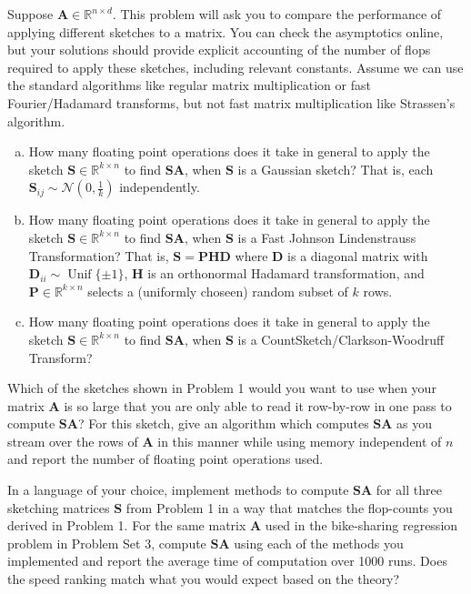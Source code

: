 \documentclass[12pt,letterpaper,cm]{hmcpset}
\newcommand\R{\mathbb{R}}
\newcommand\A{\boldsymbol{A}}
\renewcommand\P{\boldsymbol{P}}
\renewcommand\S{\boldsymbol{S}}
\renewcommand\H{\boldsymbol{H}}
\newcommand\D{\boldsymbol{D}}
\begin{document}
\begin{problem}[1]
    Suppose $\A\in\R^{n\times d}$. This problem will ask you to compare the performance of applying different sketches to a matrix. You can check the asymptotics online, but your solutions should provide explicit accounting of the number of flops required to apply these sketches, including relevant constants. Assume we can use the standard algorithms like regular matrix multiplication or fast Fourier/Hadamard transforms, but not fast matrix multiplication like Strassen's algorithm.
    \begin{enumerate}[(a)]
        \item How many floating point operations does it take in general to apply the sketch $\S\in\R^{k\times n}$ to find $\S\A$, when $\S$ is a Gaussian sketch? That is, each $\S_{ij} \sim \mathcal{N}(0,\tfrac{1}{k})$ independently.
        \item How many floating point operations does it take in general to apply the sketch $\S\in\R^{k\times n}$ to find $\S\A$, when $\S$ is a Fast Johnson Lindenstrauss Transformation? That is, $\S = \P\H\D$ where $\D$ is a diagonal matrix with $\D_{ii}\sim \operatorname{Unif}\{\pm 1\}$, $\H$ is an orthonormal Hadamard transformation, and $\P\in\R^{k\times n}$ selects a (uniformly choseen) random subset of $k$ rows.
        \item How many floating point operations does it take in general to apply the sketch $\S\in\R^{k\times n}$ to find $\S\A$, when $\S$ is a CountSketch/Clarkson-Woodruff Transform?
    \end{enumerate}
\end{problem}

\begin{solution}
    \vfill
\end{solution}

\begin{problem}[2]
    Which of the sketches shown in Problem 1 would you want to use when your matrix $\A$ is so large that you are only able to read it row-by-row in one pass to compute $\S\A$? For this sketch, give an algorithm which computes $\S\A$ as you stream over the rows of $\A$ in this manner while using memory independent of $n$ and report the number of floating point operations used.
\end{problem}

\begin{solution}
    \vfill
\end{solution}

\begin{problem}[3]
    In a language of your choice, implement methods to compute $\S\A$ for all three sketching matrices $\S$ from Problem 1 in a way that matches the flop-counts you derived in Problem 1. For the same matrix $\A$ used in the bike-sharing regression problem in Problem Set 3, compute $\S\A$ using each of the methods you implemented and report the average time of computation over 1000 runs. Does the speed ranking match what you would expect based on the theory?
\end{problem}

\begin{solution}
    \vfill
\end{solution}
\clearpage
\end{document}
